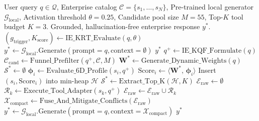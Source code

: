 \begin{algorithm}[h]
\caption{End-to-End AMORA Master Execution Pipeline}
\label{alg:end_to_end}
\begin{algorithmic}[1]
\REQUIRE User query $q \in \mathcal{Q}$, Enterprise catalog $\mathcal{C} = \{s_1, \dots, s_N\}$, Pre-trained local generator $\mathcal{G}_{\text{local}}$, Activation threshold $\theta = 0.25$, Candidate pool size $M = 55$, Top-$K$ tool budget $K = 3$.
\ENSURE Grounded, hallucination-free enterprise response $y^*$.
\STATE {}
\STATE $(g_{\text{trigger}}, K_{\text{score}}) \leftarrow \text{IE\_KRT\_Evaluate}(q, \theta)$
    \STATE {}
    \STATE $y^* \leftarrow \mathcal{G}_{\text{local}}.\text{Generate}(\text{prompt} = q, \text{context} = \emptyset)$
    \RETURN $y^*$
\ENDIF
\STATE {}
\STATE $q^+ \leftarrow \text{IE\_KQF\_Formulate}(q)$
\STATE {}
\STATE $\mathcal{C}_{\text{cand}} \leftarrow \text{Funnel\_Prefilter}(q^+, \mathcal{C}, M)$ 
\STATE {}
\STATE $\mathbf{W}^* \leftarrow \text{Generate\_Dynamic\_Weights}(q)$ 
\STATE $\mathcal{S}^* \leftarrow \emptyset$
    \STATE $\boldsymbol{\phi}_i \leftarrow \text{Evaluate\_6D\_Profile}(s_i, q^+)$
    \STATE $\text{Score}_i \leftarrow \langle \mathbf{W}^*, \, \boldsymbol{\phi}_i \rangle$
    \STATE Insert $(s_i, \text{Score}_i)$ into min-heap $\mathcal{H}$
\ENDFOR
\STATE $\mathcal{S}^* \leftarrow \text{Extract\_Top\_K}(\mathcal{H}, K)$
\STATE {}
\STATE $\mathcal{E}_{\text{raw}} \leftarrow \emptyset$
    \STATE $\mathcal{R}_k \leftarrow \text{Execute\_Tool\_Adapter}(s_k, q^+)$
    \STATE $\mathcal{E}_{\text{raw}} \leftarrow \mathcal{E}_{\text{raw}} \cup \mathcal{R}_k$
\ENDFOR
\STATE {}
\STATE $\mathcal{X}_{\text{compact}} \leftarrow \text{Fuse\_And\_Mitigate\_Conflicts}(\mathcal{E}_{\text{raw}})$ 
\STATE {}
\STATE $y^* \leftarrow \mathcal{G}_{\text{local}}.\text{Generate}(\text{prompt} = q, \text{context} = \mathcal{X}_{\text{compact}})$
\RETURN $y^*$
\end{algorithmic}
\end{algorithm}

